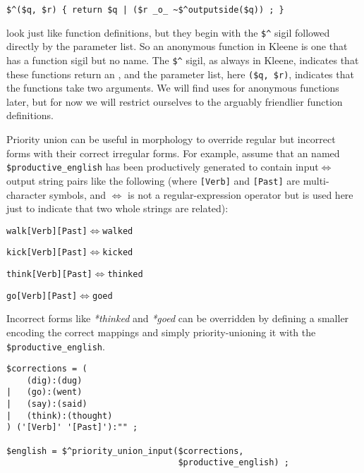 \begin{Verbatim}
$^($q, $r) { return $q | ($r _o_ ~$^outputside($q)) ; }
\end{Verbatim}


\noindent
look just like function definitions, but they begin with the \verb!$^! sigil followed directly
by the parameter list. So an anonymous function in Kleene is one that has a function sigil but 
no name.  The \verb!$^! sigil, as always in Kleene,
indicates that these functions return an \fsm{}, and the
parameter list, here \verb!($q, $r)!, indicates that the functions take two \fsm{} arguments.  We will find
uses for anonymous functions later, but for now we will restrict ourselves to the arguably friendlier function
definitions.

Priority union can be useful in morphology to override regular but incorrect
forms with their correct irregular forms.  For example, assume that
an \fsm{} named \verb!$productive_english! has been productively generated to contain
input$\Longleftrightarrow$output
string pairs like the following (where \verb![Verb]! and \verb![Past]! are
multi-character symbols, and $\Longleftrightarrow$ is not a regular-expression
operator but is used here just to indicate that two whole strings are related):

\begin{alltt}
walk[Verb][Past] \(\Longleftrightarrow\) walked

kick[Verb][Past] \(\Longleftrightarrow\) kicked

think[Verb][Past] \(\Longleftrightarrow\) thinked

go[Verb][Past] \(\Longleftrightarrow\) goed
\end{alltt}

\noindent
Incorrect forms like \emph{*thinked} and \emph{*goed} can be overridden by 
defining a
smaller \fsm{} encoding the correct mappings and simply priority-unioning it with
the \fsm{} \verb!$productive_english!.

\begin{Verbatim}
$corrections = (
    (dig):(dug)
|   (go):(went)
|   (say):(said)
|   (think):(thought)
) ('[Verb]' '[Past]'):"" ;

$english = $^priority_union_input($corrections, 
                                  $productive_english) ;
\end{Verbatim}


